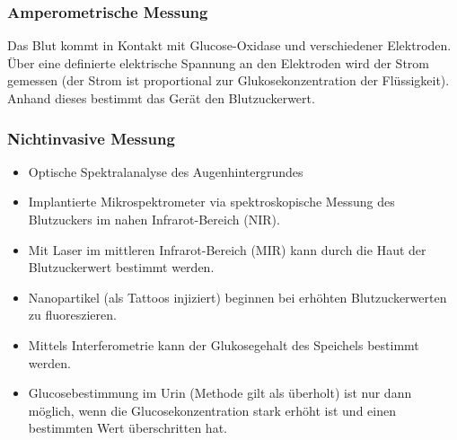 \subsubsection{Amperometrische Messung}

Das Blut kommt in Kontakt mit Glucose-Oxidase und verschiedener Elektroden. Über eine definierte elektrische Spannung an den Elektroden wird der Strom gemessen (der Strom ist proportional zur Glukosekonzentration der Flüssigkeit). Anhand dieses bestimmt das Gerät den Blutzuckerwert.

\subsubsection{Nichtinvasive Messung}

\begin{itemize}
	\item Optische Spektralanalyse des Augenhintergrundes
	\item Implantierte Mikrospektrometer via spektroskopische Messung des Blutzuckers im nahen Infrarot-Bereich (NIR).
	\item Mit Laser im mittleren Infrarot-Bereich (MIR) kann durch die Haut der Blutzuckerwert bestimmt werden.
	\item Nanopartikel (als Tattoos injiziert) beginnen bei erhöhten Blutzuckerwerten zu fluoreszieren.
	\item Mittels Interferometrie kann der Glukosegehalt des Speichels bestimmt werden.
	\item Glucosebestimmung im Urin (Methode gilt als überholt) ist nur dann möglich, wenn die Glucosekonzentration stark erhöht ist und einen bestimmten Wert überschritten hat.
\end{itemize}